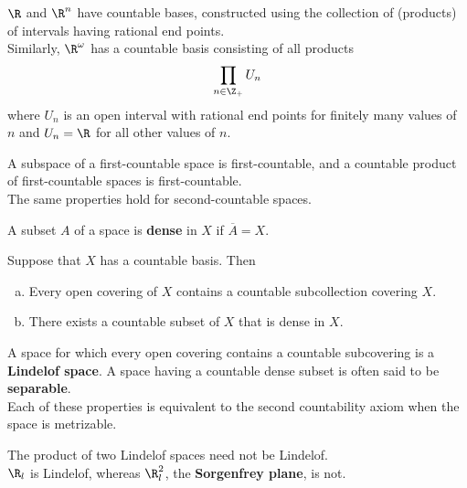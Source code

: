 \begin{eg}
$\R$ and $\R^n$ have countable bases, constructed using the collection of (products) of intervals having rational end points. \\

Similarly, $\R^\omega$ has a countable basis consisting of all products
\[
    \prod_{n \in \Z_+} U_n
\]
where $U_n$ is an open interval with rational end points for finitely many values of $n$ and $U_n = \R$ for all other values of $n$.
\end{eg}

\begin{theorem}
A subspace of a first-countable space is first-countable, and a countable product of first-countable spaces is first-countable. \\

The same properties hold for second-countable spaces.
\end{theorem}

\begin{definition}[Dense]
A subset $A$ of a space is \textbf{dense} in $X$ if $\overline{A} = X$.
\end{definition}

\begin{theorem}
Suppose that $X$ has a countable basis. Then
\begin{enumerate}[a)]
    \item Every open covering of $X$ contains a countable subcollection covering $X$. 
    \item There exists a countable subset of $X$ that is dense in $X$.
\end{enumerate}
\end{theorem}

\begin{definition}
A space for which every open covering contains a countable subcovering is a \textbf{Lindelof space}. A space having a countable dense subset is often said to be \textbf{separable}. \\

Each of these properties is equivalent to the second countability axiom when the space is metrizable.
\end{definition}

\begin{eg}
The product of two Lindelof spaces need not be Lindelof. \\

$\R_l$ is Lindelof, whereas $\R_l^2$, the \textbf{Sorgenfrey plane}, is not.
\end{eg}

